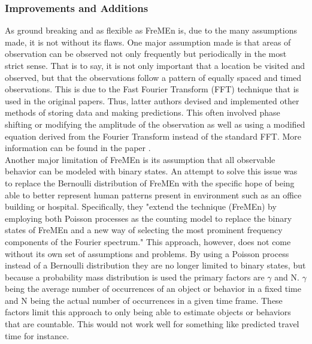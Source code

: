   \subsubsection{ Improvements and Additions }

  As ground breaking and as flexible as FreMEn is, due to the many assumptions
  made, it is not without its flaws. One major assumption made is that areas of
  observation can be observed not only frequently but periodically in the most
  strict sense. That is to say, it is not only important that a location be
  visited and observed, but that the observations follow a pattern of equally
  spaced and timed observations. This is due to the Fast Fourier Transform (FFT)
  technique that is used in the original papers. Thus, latter authors devised and
  implemented other methods of storing data and making predictions. This often
  involved phase shifting or modifying the amplitude of the observation as well
  as using a modified equation derived from the Fourier Transform instead of the
  standard FFT. More information can be found in the paper \cite{Santos2016}. \\

  Another major limitation of FreMEn is its assumption that all observable
  behavior can be modeled with binary states. An  attempt to solve this issue
  was to replace the Bernoulli distribution of FreMEn with the specific hope of
  being able to better represent human patterns present in environment such as
  an office building or hospital. Specifically, they "extend the technique
  (FreMEn) by employing both Poisson processes as the counting model to replace
  the binary states of FreMEn and a new way of selecting the most prominent
  frequency components of the Fourier spectrum."\cite{Jovan2016} This approach,
  however, does not come without its own set of assumptions and problems. By
  using a Poisson process instead of a Bernoulli distribution they are no longer
  limited to binary states, but because a probability mass distribution is used
  the primary factors are $\gamma$ and N. $\gamma$ being the average number of
  occurrences of an object or behavior in a fixed time and N being the actual
  number of occurrences in a given time frame. These factors limit this
  approach to only being able to estimate objects or behaviors that are
  countable. This would not work well for something like predicted travel time
  for instance. \\

